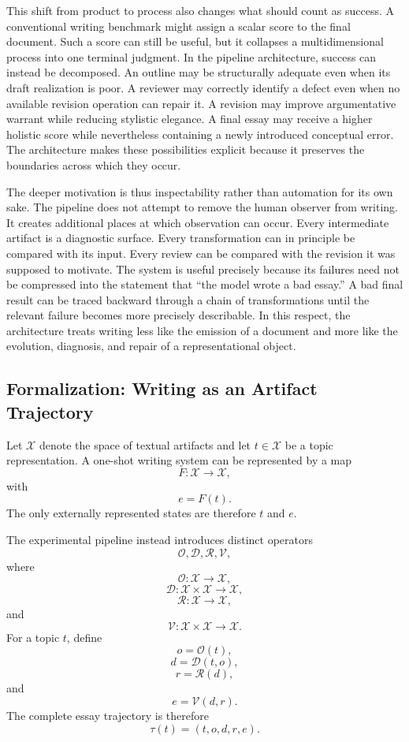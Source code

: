 \documentclass[11pt]{article}
\newcommand{\Draft}{\mathcal{D}}
\newcommand{\Review}{\mathcal{R}}
\newcommand{\Revise}{\mathcal{V}}
\newcommand{\Outline}{\mathcal{O}}
\begin{document}
This shift from product to process also changes what should count as success. A conventional writing benchmark might assign a scalar score to the final document. Such a score can still be useful, but it collapses a multidimensional process into one terminal judgment. In the pipeline architecture, success can instead be decomposed. An outline may be structurally adequate even when its draft realization is poor. A reviewer may correctly identify a defect even when no available revision operation can repair it. A revision may improve argumentative warrant while reducing stylistic elegance. A final essay may receive a higher holistic score while nevertheless containing a newly introduced conceptual error. The architecture makes these possibilities explicit because it preserves the boundaries across which they occur.

The deeper motivation is thus inspectability rather than automation for its own sake. The pipeline does not attempt to remove the human observer from writing. It creates additional places at which observation can occur. Every intermediate artifact is a diagnostic surface. Every transformation can in principle be compared with its input. Every review can be compared with the revision it was supposed to motivate. The system is useful precisely because its failures need not be compressed into the statement that ``the model wrote a bad essay.'' A bad final result can be traced backward through a chain of transformations until the relevant failure becomes more precisely describable. In this respect, the architecture treats writing less like the emission of a document and more like the evolution, diagnosis, and repair of a representational object.


\subsection{Formalization: Writing as an Artifact Trajectory}

Let \(\mathcal{X}\) denote the space of textual artifacts and let \(t\in\mathcal{X}\) be a topic representation. A one-shot writing system can be represented by a map
\[
    F:\mathcal{X}\rightarrow\mathcal{X},
\]
with
\[
    e = F(t).
\]
The only externally represented states are therefore \(t\) and \(e\).

The experimental pipeline instead introduces distinct operators
\[
    \Outline,\Draft,\Review,\Revise,
\]
where
\[
    \Outline:\mathcal{X}\rightarrow\mathcal{X},
\]
\[
    \Draft:\mathcal{X}\times\mathcal{X}\rightarrow\mathcal{X},
\]
\[
    \Review:\mathcal{X}\rightarrow\mathcal{X},
\]
and
\[
    \Revise:\mathcal{X}\times\mathcal{X}\rightarrow\mathcal{X}.
\]
For a topic \(t\), define
\[
    o=\Outline(t),
\]
\[
    d=\Draft(t,o),
\]
\[
    r=\Review(d),
\]
and
\[
    e=\Revise(d,r).
\]
The complete essay trajectory is therefore
\[
    \tau(t)=(t,o,d,r,e).
\]
\end{document}
